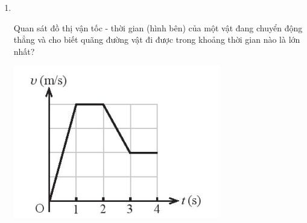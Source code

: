 \begin{enumerate}[label=\bfseries Câu \arabic*:]
{}


\item {}\\
{\begin{minipage}[l]{0.7\textwidth}
	Quan sát đồ thị vận tốc - thời gian (hình bên) của một vật đang chuyển động thẳng và cho biết quãng đường vật đi được trong khoảng thời gian nào là lớn nhất?
	\end{minipage}
	\begin{minipage}{0.3\textwidth}
		\begin{center}
			\includegraphics[width=1.0\linewidth]{../figs/VN10-2023-PH-TP0003-2}
		\end{center}
	\end{minipage}

}


\end{enumerate}
